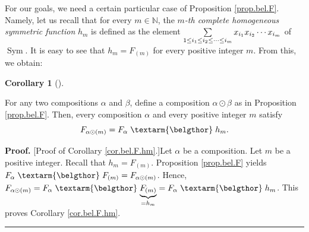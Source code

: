 \documentclass
[numbers=enddot,12pt,final,onecolumn,notitlepage,abstracton]{scrartcl}%
\theoremstyle{definition}
\newtheorem{coro}[theo]{Corollary}
\newenvironment{corollary}[1][]
{\begin{coro}[#1]\begin{leftbar}}
{\end{leftbar}\end{coro}}
\newenvironment{proof}[1][Proof]{\noindent\textbf{#1.} }{\ \rule{0.5em}{0.5em}}
\newenvironment{verlong}{}{}
\newcommand{\bel}{\left. \textarm{\belgthor} \right.}
\let\sumnonlimits\sum
\renewcommand{\sum}{\sumnonlimits\limits}
\begin{document}
For our goals, we need a certain particular case of Proposition
\ref{prop.bel.F}. Namely, let us recall that for every $m\in\mathbb{N}$, the
$m$\textit{-th complete homogeneous symmetric function} $h_{m}$ is defined as
the element $\sum\limits_{1\leq i_{1}\leq i_{2}\leq\cdots\leq i_{m}}x_{i_{1}%
}x_{i_{2}}\cdots x_{i_{m}}$ of $\operatorname*{Sym}$. It is easy to see that
$h_{m}=F_{\left(  m\right)  }$ for every positive integer $m$. From this, we obtain:

\begin{corollary}
\label{cor.bel.F.hm}For any two compositions $\alpha$ and $\beta$, define a
composition $\alpha\odot\beta$ as in Proposition \ref{prop.bel.F}. Then, every
composition $\alpha$ and every positive integer $m$ satisfy%
\begin{equation}
F_{\alpha\odot\left(  m\right)  }=F_{\alpha} \bel h_{m}. \label{pf.hmDless.2}%
\end{equation}

\end{corollary}

\begin{verlong}
\begin{proof}
[Proof of Corollary \ref{cor.bel.F.hm}.]Let $\alpha$ be a composition. Let $m$
be a positive integer. Recall that $h_{m}=F_{\left(  m\right)  }$. Proposition
\ref{prop.bel.F} yields $F_{\alpha} \bel F_{\left(  m\right)  }=F_{\alpha
\odot\left(  m\right)  }$. Hence, $F_{\alpha\odot\left(  m\right)  }%
=F_{\alpha} \bel \underbrace{F_{\left(  m\right)  }}_{=h_{m}}=F_{\alpha}
\bel h_{m}$. This proves Corollary \ref{cor.bel.F.hm}.
\end{proof}
\end{verlong}
\end{document}
